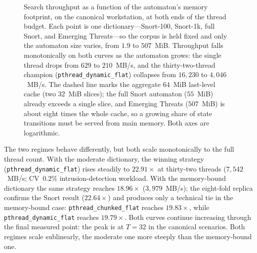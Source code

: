 \begin{figure}[H]
\caption{Search throughput as a function of the automaton's memory footprint, on
the canonical workstation, at both ends of the thread budget. Each point is one
dictionary---Snort-100, Snort-1k, full Snort, and Emerging Threats---so the corpus
is held fixed and only the automaton size varies, from $1.9$ to $507$~MiB.
Throughput falls monotonically on both curves as the automaton grows: the single
thread drops from $629$ to $210$~MB/s, and the thirty-two-thread champion
(\texttt{pthread\_\allowbreak dynamic\_\allowbreak flat}) collapses from
$16{,}230$ to $4{,}046$~MB/s. The dashed line marks the aggregate $64$~MiB
last-level cache (two $32$~MiB slices); the full Snort automaton ($55$~MiB) already
exceeds a single slice, and Emerging Threats ($507$~MiB) is about eight times the
whole cache, so a growing share of state transitions must be served from main
memory. Both axes are logarithmic.}
\label{fig:cache_cliff}
\end{figure}

The two regimes behave differently, but both scale monotonically to the full
thread count. With the moderate dictionary, the winning strategy
(\texttt{pthread\_dynamic\_flat}) rises steadily to $22.91\times$ at thirty-two
threads ($7{,}542$~MB/s; CV~$0.2\%$
intrusion-detection workload. With the memory-bound dictionary the same strategy
reaches $18.96\times$ ($3{,}979$~MB/s); the eight-fold replica confirms the Snort
result ($22.64\times$) and produces only a technical tie in the memory-bound case:
\texttt{pthread\_\allowbreak chunked\_\allowbreak flat} reaches $19.83\times$,
while \texttt{pthread\_\allowbreak dynamic\_\allowbreak flat} reaches
$19.79\times$. Both curves continue increasing through the final measured point:
the peak is at $T=32$ in the canonical scenarios. Both regimes scale sublinearly,
the moderate one more steeply than the memory-bound one.


